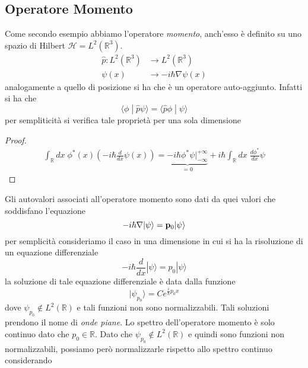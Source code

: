 \subsection{Operatore Momento}
\noindent Come secondo esempio abbiamo l'operatore \textit{momento}, anch'esso \`e definito su uno spazio di Hilbert $\mathcal{H} = L^2(\mathbb{R}^3)$.
\begin{equation*}
\begin{aligned}
\hat{p}: L^2(\mathbb{R}^3) & \rightarrow L^2(\mathbb{R}^3) \\
\psi(x) & \rightarrow -i \hbar \nabla \psi(x)
\end{aligned}
\end{equation*}
analogamente a quello di posizione si ha che \`e un operatore auto-aggiunto. Infatti si ha che \
\begin{equation*}
	\langle \phi \; | \; \hat{p} \psi \rangle = \langle \hat{p} \phi \; | \; \psi \rangle 
\end{equation*}
per sempliticit\`a si verifica tale propriet\`a per una sola dimensione 
\begin{proof}
	\begin{equation*}
		\begin{array}{l}
			\int_{\mathbb{R}} dx \; \phi^*(x) \left ( -i\hbar \frac{d}{dx}\psi(x) \right) = \underbrace{-i\hbar \phi^*\psi \Big \vert_{- \infty}^{+\infty}}_{=0} + i \hbar \int_{\mathbb{R}} dx\;  \frac{d\phi^*}{dx} \psi 
		\end{array}
	\end{equation*}
\end{proof}
\noindent Gli autovalori associati all'operatore momento sono dati da quei valori che soddisfano l'equazione 
\begin{equation*}
	-i\hbar \nabla |\psi\rangle  = \bold{p}_0 |\psi\rangle 
\end{equation*}
per semplicit\`a consideriamo il caso in una dimensione in cui si ha la risoluzione di un equazione differenziale
\begin{equation*}
	-i\hbar \frac{d}{dx}|\psi \rangle = p_0 |\psi \rangle 
\end{equation*}
la soluzione di tale equazione differenziale \`e data dalla funzione 
\begin{equation*}
	|\psi_{p_0} \rangle = Ce^{\frac{i}{\hbar}p_{0}x}
\end{equation*}
dove $\psi_{p_0} \notin L^2(\mathbb{R})$ e tali funzioni non sono normalizzabili. Tali soluzioni prendono il nome di \textit{onde piane}. Lo spettro dell'operatore momento \`e solo continuo dato che $p_0 \in \mathbb{R}$. Dato che $\psi_{p_0} \notin L^2(\mathbb{R})$ e quindi sono funzioni non normalizzabili, possiamo per\`o normalizzarle rispetto allo spettro continuo considerando 
